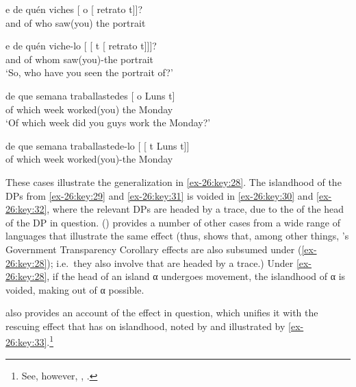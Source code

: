 \documentclass[output=paper]{langsci/langscibook}
\begin{document}
\ea\label{ex-26:key:29}  \parencite[81]{Uriagereka1988}
    \gll \llap{*}e de quén viches [ o [ retrato t]]?\\
        and of who saw(you) {} the {} portrait\\
\z

\ea\label{ex-26:key:30}  \parencite[81]{Uriagereka1988}
    \gll e de quén viche-lo [ [ t [ retrato t]]]?\\
	        and of whom saw(you)-the {} {} {} {} portrait\\
    \glt \enquote*{So, who have you seen the portrait of?}
\z

\ea\label{ex-26:key:31}  \parencite[58]{Boskovic2016}
    \gll {}de que semana traballastedes [ o Luns t]\\
		    of which week worked(you) {} the Monday\\
    \glt \enquote*{Of which week did you guys work the Monday?}
\z

\ea\label{ex-26:key:32}  \parencite[58]{Boskovic2016}
	\gll    de  que  semana  traballastede-lo [ [ t  Luns t]] \\
            of  which week worked(you)-the {} {} {} Monday\\
\z

These cases illustrate the generalization in \eqref{ex-26:key:28}. The islandhood
of the DPs from \eqref{ex-26:key:29} and \eqref{ex-26:key:31} is voided in \eqref{ex-26:key:30} and \eqref{ex-26:key:32}, where the relevant
DPs are headed by a trace, due to the  of the head of the DP in
question.  \citeauthor{Boskovic2013b} (\citeyear{Boskovic2013b,Boskovic2015})
provides a number of other cases from a wide range of languages that illustrate
the same effect (thus, \citealt{Boskovic2013b} shows that, among other things,
\citeauthor{Baker1988}’s \citeyear{Baker1988} Government Transparency Corollary
effects are also subsumed under (\ref{ex-26:key:28}); i.e.\ they also involve 
that are headed by a trace.) Under \eqref{ex-26:key:28}, if the head of an island α undergoes
movement, the islandhood of α is voided, making  out of α
possible.

\largerpage
\textcite{Boskovic2011,Boskovic2013b} also provides an account of the effect in
question, which unifies it with the rescuing effect that  has on
islandhood, noted by \citet{Ross1969} and illustrated by \eqref{ex-26:key:33}.\footnote{See,
    however, \citet{Abels2011}, \citet{BarEllTho2014}.}
\end{document}

